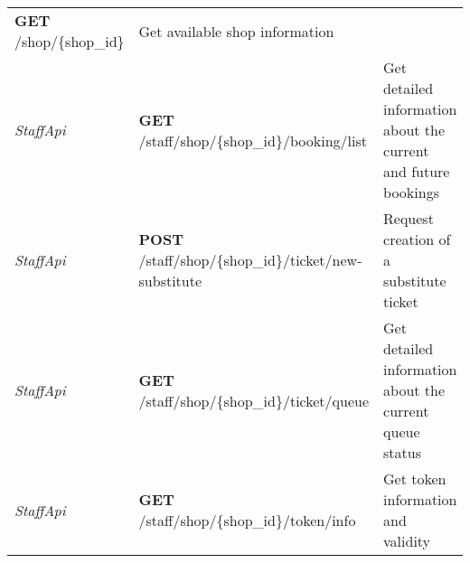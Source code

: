 \begin{longtable}[]{@{}lll@{}}
\begin{minipage}[t]{0.31\columnwidth}
\textbf{GET} /shop/\{shop\_id\}\strut
\end{minipage} & \begin{minipage}[t]{0.31\columnwidth}\raggedright
Get available shop information\strut
\end{minipage}\tabularnewline
\begin{minipage}[t]{0.29\columnwidth}\raggedright
\emph{StaffApi}\strut
\end{minipage} & \begin{minipage}[t]{0.31\columnwidth}\raggedright
\textbf{GET} /staff/shop/\{shop\_id\}/booking/list\strut
\end{minipage} & \begin{minipage}[t]{0.31\columnwidth}\raggedright
Get detailed information about the current and future bookings\strut
\end{minipage}\tabularnewline
\begin{minipage}[t]{0.29\columnwidth}\raggedright
\emph{StaffApi}\strut
\end{minipage} & \begin{minipage}[t]{0.31\columnwidth}\raggedright
\textbf{POST} /staff/shop/\{shop\_id\}/ticket/new-substitute\strut
\end{minipage} & \begin{minipage}[t]{0.31\columnwidth}\raggedright
Request creation of a substitute ticket\strut
\end{minipage}\tabularnewline
\begin{minipage}[t]{0.29\columnwidth}\raggedright
\emph{StaffApi}\strut
\end{minipage} & \begin{minipage}[t]{0.31\columnwidth}\raggedright
\textbf{GET} /staff/shop/\{shop\_id\}/ticket/queue\strut
\end{minipage} & \begin{minipage}[t]{0.31\columnwidth}\raggedright
Get detailed information about the current queue status\strut
\end{minipage}\tabularnewline
\begin{minipage}[t]{0.29\columnwidth}\raggedright
\emph{StaffApi}\strut
\end{minipage} & \begin{minipage}[t]{0.31\columnwidth}\raggedright
\textbf{GET} /staff/shop/\{shop\_id\}/token/info\strut
\end{minipage} & \begin{minipage}[t]{0.31\columnwidth}\raggedright
Get token information and validity\strut
\end{minipage}\tabularnewline

\end{longtable}

